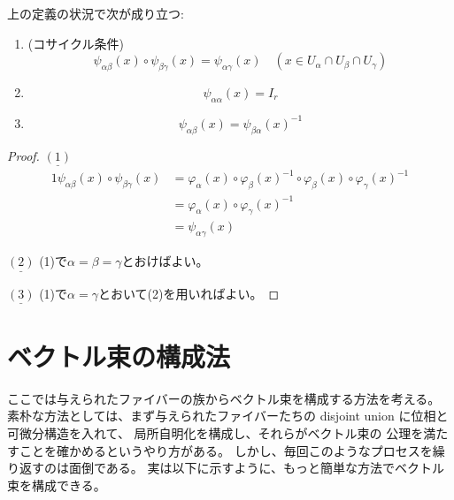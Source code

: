 \documentclass[report]{jlreq}
\begin{document}
\begin{proposition}[変換関数の基本性質]
    上の定義の状況で次が成り立つ:
    \begin{enumerate}
        \item (コサイクル条件)
            \begin{equation}
                \psi_{\alpha\beta}(x) \circ \psi_{\beta\gamma}(x)
                    = \psi_{\alpha\gamma}(x)
                \quad (x \in U_\alpha \cap U_\beta \cap U_\gamma)
            \end{equation}
        \item
            \begin{equation}
                \psi_{\alpha\alpha}(x) = I_r
            \end{equation}
        \item
            \begin{equation}
                \psi_{\alpha\beta}(x) = \psi_{\beta\alpha}(x)^{-1}
            \end{equation}
    \end{enumerate}
\end{proposition}

\begin{proof}
    $\underline{(1)}$ \quad
    \begin{alignat}{1}
        \psi_{\alpha\beta}(x) \circ \psi_{\beta\gamma}(x)
            &= \varphi_\alpha(x) \circ \varphi_\beta(x)^{-1}
                \circ \varphi_\beta(x) \circ \varphi_\gamma(x)^{-1} \\
            &= \varphi_\alpha(x) \circ \varphi_\gamma(x)^{-1} \\
            &= \psi_{\alpha\gamma}(x)
    \end{alignat}

    $\underline{(2)}$ \quad
    (1)で$\alpha = \beta = \gamma$とおけばよい。

    $\underline{(3)}$ \quad
    (1)で$\alpha = \gamma$とおいて(2)を用いればよい。
\end{proof}

%
\section{ベクトル束の構成法}

ここでは与えられたファイバーの族からベクトル束を構成する方法を考える。
素朴な方法としては、まず与えられたファイバーたちの
disjoint union に位相と可微分構造を入れて、
局所自明化を構成し、それらがベクトル束の
公理を満たすことを確かめるというやり方がある。
しかし、毎回このようなプロセスを繰り返すのは面倒である。
実は以下に示すように、もっと簡単な方法でベクトル束を構成できる。
\end{document}
